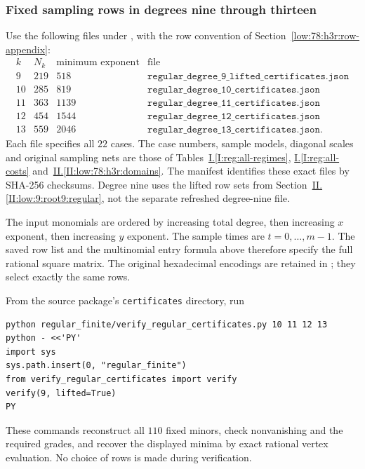 \documentclass[11pt]{amsart}
\theoremstyle{definition}
\theoremstyle{remark}
\numberwithin{equation}{section}
\newcommand{\partIref}[1]{\hyperref[I:#1]{I.\ref*{I:#1}}}
\newcommand{\partIIref}[1]{\hyperref[II:#1]{II.\ref*{II:#1}}}
\begin{document}
\subsubsection{Fixed sampling rows in degrees nine through thirteen}\label{low:row-masks}

Use the following files under , with the row convention of Section~\ref{low:78:h3r:row-appendix}:
\[
\begin{array}{cccl}
k&N_k&\text{minimum exponent}&\text{file}\\
9&219&518&\texttt{regular\_degree\_9\_lifted\_certificates.json}\\
10&285&819&\texttt{regular\_degree\_10\_certificates.json}\\
11&363&1139&\texttt{regular\_degree\_11\_certificates.json}\\
12&454&1544&\texttt{regular\_degree\_12\_certificates.json}\\
13&559&2046&\texttt{regular\_degree\_13\_certificates.json}.
\end{array}
\]
Each file specifies all $22$ cases. The case numbers, sample models, diagonal scales and original sampling nets are those of Tables~\partIref{reg:all-regimes}, \partIref{reg:all-costs} and~\partIIref{low:78:h3r:domains}. The manifest  identifies these exact files by SHA-256 checksums. Degree nine uses the lifted row sets from Section~\partIIref{low:9:root9:regular}, not the separate refreshed degree-nine file.

The input monomials are ordered by increasing total degree, then increasing $x$ exponent, then increasing $y$ exponent. The sample times are $t=0,\ldots,m-1$. The saved row list and the multinomial entry formula above therefore specify the full rational square matrix. The original hexadecimal encodings are retained in ; they select exactly the same rows.

From the source package's \texttt{certificates} directory, run
\begin{verbatim}
python regular_finite/verify_regular_certificates.py 10 11 12 13
python - <<'PY'
import sys
sys.path.insert(0, "regular_finite")
from verify_regular_certificates import verify
verify(9, lifted=True)
PY
\end{verbatim}
These commands reconstruct all $110$ fixed minors, check nonvanishing and the required grades, and recover the displayed minima by exact rational vertex evaluation. No choice of rows is made during verification.
\end{document}
